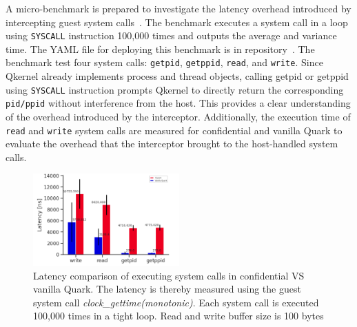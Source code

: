 A micro-benchmark is prepared to investigate the latency overhead introduced by intercepting guest system calls~\cite*{benchamark_systemcall_intercetion}. The benchmark executes a system call in a loop using \texttt{SYSCALL} instruction 100,000 times and outputs the average and variance time. The YAML file for deploying this benchmark is 
in repository~\cite*{perf_test_repo}. The benchmark test four system calls: \texttt{getpid}, \texttt{getppid}, \texttt{read}, and \texttt{write}. Since Qkernel already implements process and thread objects, calling getpid or getppid using \texttt{SYSCALL} instruction prompts Qkernel to directly return the corresponding \texttt{pid/ppid} without interference from the 
host. This provides a clear understanding of the overhead introduced by the interceptor. Additionally, the execution time of \texttt{read} and \texttt{write} system calls are measured for confidential and vanilla Quark to evaluate the overhead that the interceptor brought to the host-handled system calls.

\begin{figure}[!htb]
    \centering
    \includegraphics[width=0.5\textwidth]{images/ben_results_syscall_interceptor.PNG}
    \caption[Benchmark result of Syscall Interceptor]{Latency comparison of executing system calls in confidential VS vanilla Quark. The latency is thereby measured using the guest system call \emph{clock\_gettime(monotonic)}. 
        Each system call is executed 100,000  times in a tight loop. Read and write buffer size is 100 bytes}
    \label{fig:ben_results_syscall_interceptor}
\end{figure}

